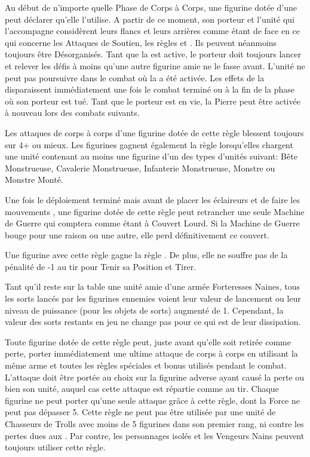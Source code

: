 Au début de n'importe quelle Phase de Corps à Corps, une figurine dotée d'une \holdstone peut déclarer qu'elle l'utilise. A partir de ce moment, son porteur et l'unité qui l'accompagne considèrent leurs flancs et leurs arrières comme étant de face en ce qui concerne les Attaques de Soutien, les règles \parry et \shieldwall. Ils peuvent néanmoins toujours être Désorganisés. Tant que la \holdstone est active, le porteur doit toujours lancer et relever les défis à moins qu'une autre figurine amie ne le fasse avant. L'unité ne peut pas poursuivre dans le combat où la \holdstone a été activée. Les effets de la \holdstone disparaissent immédiatement une fois le combat terminé ou à la fin de la phase où son porteur est tué. Tant que le porteur est en vie, la Pierre peut être activée à nouveau lors des combats suivants.

\armyspecialruleentry{\thebiggertheyare}

Les attaques de corps à corps d'une figurine dotée de cette règle blessent toujours sur 4+ ou mieux. Les figurines gagnent également la règle \swiftstride lorsqu'elles chargent une unité contenant au moins une figurine d'un des types d'unités suivant: Bête Monstrueuse, Cavalerie Monstrueuse, Infanterie Monstrueuse, Monstre ou Monstre Monté.

\armyspecialruleentry{\entrench}

Une fois le déploiement terminé mais avant de placer les éclaireurs et de faire les mouvements \vanguard, une figurine dotée de cette règle peut retrancher une seule Machine de Guerre qui comptera comme étant à Couvert Lourd. Si la Machine de Guerre bouge pour une raison ou une autre, elle perd définitivement ce couvert.

\armyspecialruleentry{\sturdy}

Une figurine avec cette règle gagne la règle \thunderouscharge. De plus, elle ne souffre pas de la pénalité de -1 au tir pour Tenir sa Position et Tirer. 

\armyspecialruleentry{\hewnoutofmountains}

Tant qu'il reste sur la table une unité amie d'une armée Forteresses Naines, tous les sorts lancés par les figurines ennemies voient leur valeur de lancement ou leur niveau de puissance (pour les objets de sorts) augmenté de 1. Cependant, la valeur des sorts restants en jeu ne change pas pour ce qui est de leur dissipation.


\armyspecialruleentry{\comewithme}

Toute figurine dotée de cette règle peut, juste avant qu'elle soit retirée comme perte, porter immédiatement une ultime attaque de corps à corps en utilisant la même arme et toutes les règles spéciales et bonus utilisés pendant le combat. L'attaque doit être portée au choix sur la figurine adverse ayant causé la perte ou bien son unité, auquel cas cette attaque est répartie comme au tir. Chaque figurine ne peut porter qu'une seule attaque grâce à cette règle, dont la Force ne peut pas dépasser 5. Cette règle ne peut pas être utilisée par une unité de Chasseurs de Trolls avec moins de 5 figurines dans son premier rang, ni contre les pertes dues aux \impacthits{}. Par contre, les personnages isolés et les Vengeurs Nains peuvent toujours utiliser cette règle.

